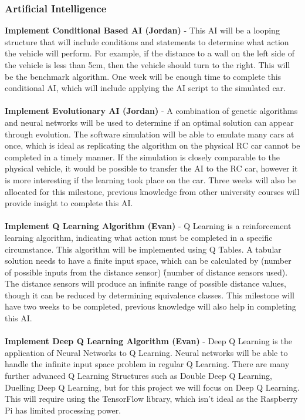 \documentclass[8pt]{article}
\begin{document}
\subsubsection{Artificial Intelligence}
\textbf{Implement Conditional Based AI (Jordan)} - This AI will be a looping structure that will include conditions and statements to determine what action the vehicle will perform. For example, if the distance to a wall on the left side of the vehicle is less than 5cm, then the vehicle should turn to the right. This will be the benchmark algorithm. One week will be enough time to complete this conditional AI, which will include applying the AI script to the simulated car.
\\\\
\textbf{Implement Evolutionary AI (Jordan)} - A combination of genetic algorithms and neural networks will be used to determine if an optimal solution can appear through evolution. The software simulation will be able to emulate many cars at once, which is ideal as replicating the algorithm on the physical RC car cannot be completed in a timely manner. If the simulation is closely comparable to the physical vehicle, it would be possible to transfer the AI to the RC car, however it is more interesting if the learning took place on the car. Three weeks will also be allocated for this milestone, previous knowledge from other university courses will provide insight to complete this AI.
\\\\
\textbf{Implement Q Learning Algorithm (Evan)} - Q Learning\cite{QLearningRobotControl} is a reinforcement learning algorithm, indicating what action must be completed in a specific circumstance. This algorithm will be implemented using Q Tables\cite{QLearningTabular}. A tabular solution needs to have a finite input space, which can be calculated by (number of possible inputs from the distance sensor) \^ (number of distance sensors used). The distance sensors will produce an infinite range of possible distance values, though it can be reduced by determining equivalence classes. This milestone will have two weeks to be completed, previous knowledge will also help in completing this AI. 
\\\\
\textbf{Implement Deep Q Learning Algorithm (Evan)} -  Deep Q Learning\cite{DeepQLearning} is the application of Neural Networks to Q Learning. Neural networks will be able to handle the infinite input space problem in regular Q Learning. There are many further advanced Q Learning Structures such as Double Deep Q Learning, Duelling Deep Q Learning, but for this project we will focus on Deep Q Learning. This will require using the TensorFlow library, which isn’t ideal as the Raspberry Pi has limited processing power.
\end{document}
